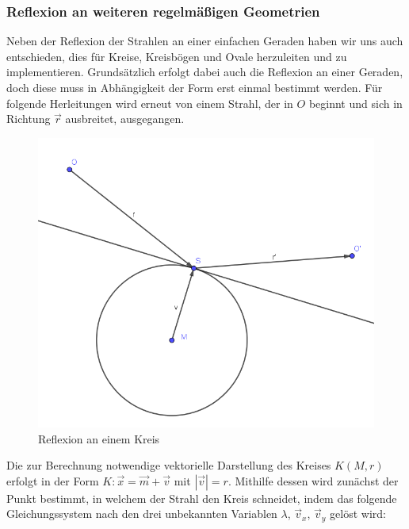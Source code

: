 \documentclass[reducespace,stylepage,semiarbeit]{spezidoc}
\begin{document}
\subsubsection{Reflexion an weiteren regelmäßigen Geometrien}
Neben der Reflexion der Strahlen an einer einfachen Geraden haben wir uns auch entschieden, dies für Kreise, Kreisbögen und Ovale herzuleiten und zu implementieren. 
Grundsätzlich erfolgt dabei auch die Reflexion an einer Geraden, doch diese muss in Abhängigkeit der Form erst einmal bestimmt werden. 
Für folgende Herleitungen wird erneut von einem Strahl, der in $O$ beginnt und sich in Richtung $\vec{r}$ ausbreitet, ausgegangen.
\newpage
\begin{figure}
\includegraphics[scale=0.5]{pictures/CircleRef.png}
\caption{Reflexion an einem Kreis}
\end{figure}
Die zur Berechnung notwendige vektorielle Darstellung des Kreises $K(M, r)$ erfolgt in der Form $K: \vec{x} = \vec{m} + \vec{v}$ mit $|\vec{v}| = r$.
Mithilfe dessen wird zunächst der Punkt bestimmt, in welchem der Strahl den Kreis schneidet, indem das folgende Gleichungssystem nach den drei unbekannten Variablen $\lambda$, $\vec{v}_x$, $\vec{v}_y$ gelöst wird:
\end{document}
